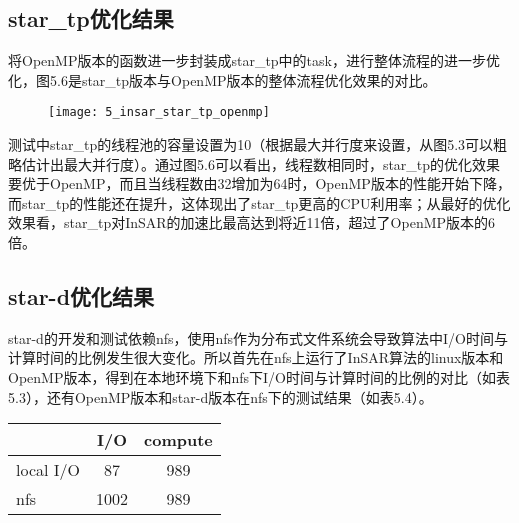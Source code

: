 \subsection{star\_tp优化结果}

将OpenMP版本的函数进一步封装成star\_tp中的task，进行整体流程的进一步优化，图5.6是star\_tp版本与OpenMP版本的整体流程优化效果的对比。

\begin{figure}[!htbp]
    \centering
    \texttt{[image: 5\_insar\_star\_tp\_openmp]}
    \label{fig:5_insar_star_tp_openmp}
\end{figure}

测试中star\_tp的线程池的容量设置为10（根据最大并行度来设置，从图5.3可以粗略估计出最大并行度）。通过图5.6可以看出，线程数相同时，star\_tp的优化效果要优于OpenMP，而且当线程数由32增加为64时，OpenMP版本的性能开始下降，而star\_tp的性能还在提升，这体现出了star\_tp更高的CPU利用率；从最好的优化效果看，star\_tp对InSAR的加速比最高达到将近11倍，超过了OpenMP版本的6倍。

\subsection{star-d优化结果}

star-d的开发和测试依赖nfs，使用nfs作为分布式文件系统会导致算法中I/O时间与计算时间的比例发生很大变化。所以首先在nfs上运行了InSAR算法的linux版本和OpenMP版本，得到在本地环境下和nfs下I/O时间与计算时间的比例的对比（如表5.3），还有OpenMP版本和star-d版本在nfs下的测试结果（如表5.4）。

\begin{table}[!htbp]
    \label{tab:5_insar_openmp_result}
    \centering
    \footnotesize
    \setlength{\tabcolsep}{4pt}
    \renewcommand{\arraystretch}{1.2} 
    \begin{tabular}{|l|c|c|}
        \hline
        			&   I/O		& 	compute	\\ \hline
		local I/O	&   87		&   989		\\ \hline
		nfs			&	1002	&   989		\\ \hline
    \end{tabular}
\end{table}

